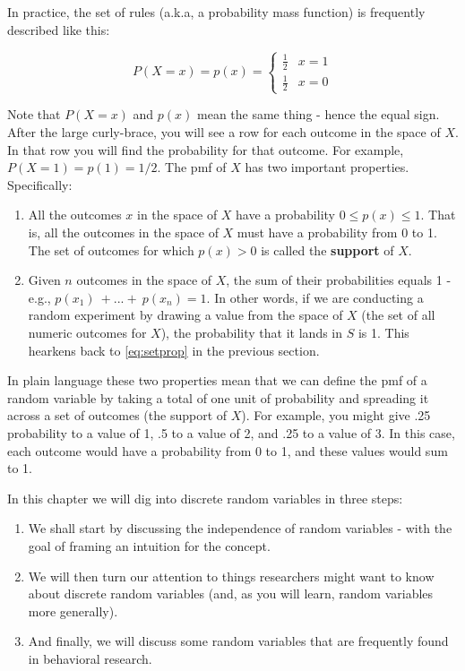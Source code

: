 \documentclass[
]{book}
\theoremstyle{definition}
\theoremstyle{definition}
\theoremstyle{definition}
\theoremstyle{definition}
\theoremstyle{remark}
\begin{document}
In practice, the set of rules (a.k.a, a probability mass function) is frequently described like this:

\[
P(X=x) = p(x) = 
\begin{cases}
\frac{1}{2} & x = 1 \\
\frac{1}{2} & x = 0
\end{cases}
\]

Note that \(P(X = x)\) and \(p(x)\) mean the same thing - hence the equal sign. After the large curly-brace, you will see a row for each outcome in the space of \(X\). In that row you will find the probability for that outcome. For example, \(P(X = 1) = p(1) = 1/2\). The pmf of \(X\) has two important properties. Specifically:

\begin{enumerate}
\def\labelenumi{\arabic{enumi}.}
\item
  All the outcomes \(x\) in the space of \(X\) have a probability \(0 \leq p(x) \leq 1\). That is, all the outcomes in the space of \(X\) must have a probability from 0 to 1. The set of outcomes for which \(p(x) > 0\) is called the \textbf{support} of \(X\).
\item
  Given \(n\) outcomes in the space of \(X\), the sum of their probabilities equals 1 - e.g., \(p(x_1)\:+...+\:p(x_n) = 1\). In other words, if we are conducting a random experiment by drawing a value from the space of \(X\) (the set of all numeric outcomes for \(X\)), the probability that it lands in \(S\) is 1. This hearkens back to \eqref{eq:setprop} in the previous section.
\end{enumerate}

In plain language these two properties mean that we can define the pmf of a random variable by taking a total of one unit of probability and spreading it across a set of outcomes (the support of \(X\)). For example, you might give .25 probability to a value of 1, .5 to a value of 2, and .25 to a value of 3. In this case, each outcome would have a probability from 0 to 1, and these values would sum to 1.

In this chapter we will dig into discrete random variables in three steps:

\begin{enumerate}
\def\labelenumi{\arabic{enumi}.}
\item
  We shall start by discussing the independence of random variables - with the goal of framing an intuition for the concept.
\item
  We will then turn our attention to things researchers might want to know about discrete random variables (and, as you will learn, random variables more generally).
\item
  And finally, we will discuss some random variables that are frequently found in behavioral research.
\end{enumerate}
\end{document}
